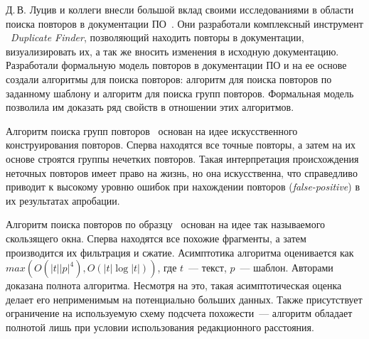 

Д.\,В. Луцив и коллеги внесли большой вклад своими исследованиями в области поиска повторов в документации ПО~\cite{luciv2018detecting,luciv2018duplicate,luciv2019interactive,koznov2015clone,koznov2017duplicate,luciv2016fuzzy}. 
Они разработали комплексный инструмент \
\emph{Duplicate Finder}, позволяющий  находить повторы в документации, визуализировать их, а так же вносить изменения в исходную документацию.
Разработали формальную модель повторов в документации ПО и на ее основе создали алгоритмы для поиска повторов:  алгоритм для поиска повторов по заданному шаблону и  алгоритм для поиска групп повторов.
Формальная модель позволила им доказать ряд свойств в отношении этих алгоритмов.

Алгоритм поиска групп повторов~\cite{luciv2016fuzzy} основан на идее искусственного конструирования повторов.
Сперва находятся все точные повторы, а затем на их основе строятся группы нечетких повторов.
Такая интерпретация происхождения неточных повторов имеет право на жизнь, но она искусственна, что справедливо приводит к высокому уровню ошибок при нахождении повторов (\emph{false-positive}) в их результатах апробации.


Алгоритм поиска повторов по образцу~\cite{luciv2019interactive} основан на идее так называемого скользящего окна.
Сперва находятся все похожие фрагменты, а затем производится их фильтрация и сжатие.
Асимптотика алгоритма оценивается как $max(O(|t||p|^4),O(|t| \log |t|))$, где $t$~--- текст, $p$~--- шаблон.
Авторами доказана полнота алгоритма.
Несмотря на это, такая асимптотическая оценка делает его неприменимым на потенциально больших данных.
Также присутствует ограничение на используемую схему подсчета похожести~--- алгоритм обладает полнотой лишь при условии использования редакционного расстояния.

